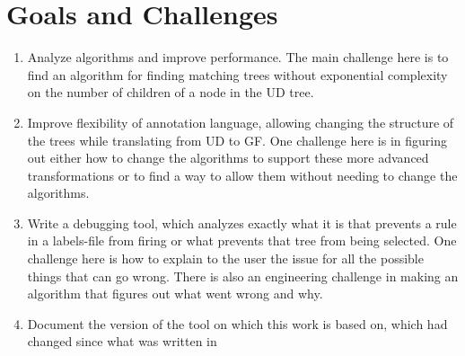 

\section{Goals and Challenges}





\begin{enumerate}
    \item 
Analyze algorithms and improve performance. The main challenge here is to find an algorithm for finding matching trees without exponential complexity on the number of children of a node in the UD tree.

\item
Improve flexibility of annotation language, allowing changing the structure of the trees while translating from UD to GF. One challenge here is in figuring out either how to change the algorithms to support these more advanced transformations or to find a way to allow them without needing to change the algorithms.
\item
 Write a debugging tool, which analyzes exactly what it is that prevents a rule in a labels-file from firing or what prevents that tree from being selected.
One challenge here is how to explain to the user the issue for all the possible things that can go wrong.
There is also an engineering challenge in making an algorithm that figures out what went wrong and why.

\item
 Document the version of the tool on which this work is based on, which had changed since what was written in \cite{kolachina-ranta-2017}
\end{enumerate}

